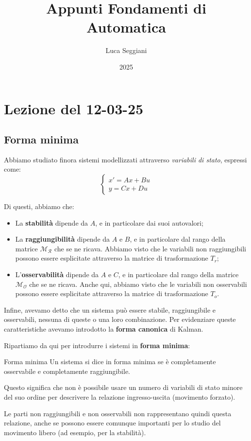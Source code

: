 \documentclass[a4paper,11pt]{article}
\title{Appunti Fondamenti di Automatica}
\author{Luca Seggiani}
\date{2025}
\begin{document}
\section{Lezione del 12-03-25}

\thispagestyle{empty}
\pagestyle{fancy}

\subsection{Forma minima}
Abbiamo studiato finora sistemi modellizzati attraverso \textit{variabili di stato}, espressi come:
\[
	\begin{cases}
		x' = Ax + Bu \\ 
		y = Cx + Du
	\end{cases}
\]

Di questi, abbiamo che:
\begin{itemize}
	\item La \textbf{stabilità} dipende da $A$, e in particolare dai suoi autovalori;
	\item La \textbf{raggiungibilità} dipende da $A$ e $B$, e in particolare dal rango della matrice $\mathcal{M}_\mathcal{R}$ che se ne ricava. Abbiamo visto che le variabili non raggiungibili possono essere esplicitate attraverso la matrice di trasformazione $T_r$;
	\item L'\textbf{osservabilità} dipende da $A$ e $C$, e in particolare dal rango della matrice $\mathcal{M}_\mathcal{O}$ che se ne ricava. Anche qui, abbiamo visto che le variabili non osservabili possono essere esplicitate attraverso la matrice di trasformazione $T_o$.
\end{itemize}

Infine, avevamo detto che un sistema può essere stabile, raggiungibile e osservabili, nessuna di queste o una loro combinazione.
Per evidenziare queste caratteristiche avevamo introdotto la \textbf{forma canonica} di Kalman.

Ripartiamo da qui per introdurre i sistemi in \textbf{forma minima}:
\begin{definition}{Forma minima}
	Un sistema si dice in forma minima se è completamente osservabile e completamente raggiungibile.
\end{definition}

Questo significa che non è possibile usare un numero di variabili di stato minore del suo ordine per descrivere la relazione ingresso-uscita (movimento forzato).

Le parti non raggiungibili e non osservabili non rappresentano quindi questa relazione, anche se possono essere comunque importanti per lo studio del movimento libero (ad esempio, per la stabilità).
\end{document}

